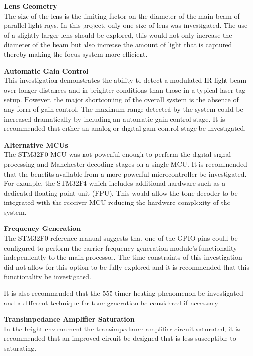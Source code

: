 \textbf{Lens Geometry}\\
The size of the lens is the limiting factor on the diameter of the main beam of parallel light rays. In this project, only one size of lens was investigated. The use of a slightly larger lens should be explored, this would not only increase the diameter of the beam but also increase the amount of light that is captured thereby making the focus system more efficient.

\textbf{Automatic Gain Control}\\
This investigation demonstrates the ability to detect a modulated IR light beam over longer distances and in brighter conditions than those in a typical laser tag setup. However, the major shortcoming of the overall system is the absence of any form of gain control. The maximum range detected by the system could be increased dramatically by including an automatic gain control stage. It is recommended that either an analog or digital gain control stage be investigated.

\textbf{Alternative MCUs}\\
The STM32F0 MCU was not powerful enough to perform the digital signal processing and Manchester decoding stages on a single MCU. It is recommended that the benefits available from a more powerful microcontroller be investigated. For example, the STM32F4 which includes additional hardware such as a dedicated floating-point unit (FPU). This would allow the tone decoder to be integrated with the receiver MCU reducing the hardware complexity of the system.

\textbf{Frequency Generation}\\
The STM32F0 reference manual suggests that one of the GPIO pins could be configured to perform the carrier frequency generation module's functionality independently to the main processor. The time constraints of this investigation did not allow for this option to be fully explored and it is recommended that this functionality be investigated.

It is also recommended that the 555 timer heating phenomenon be investigated and a different technique for tone generation be considered if necessary.

\textbf{Transimpedance Amplifier Saturation}\\
In the bright environment the transimpedance amplifier circuit saturated, it is recommended that an improved circuit be designed that is less susceptible to saturating.

